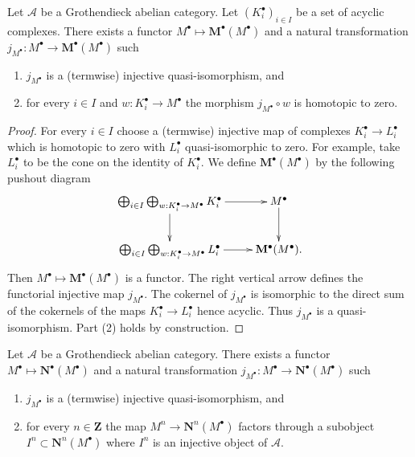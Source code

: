 \begin{lemma}
\label{lemma-functorial-homotopies}
Let $\mathcal{A}$ be a Grothendieck abelian category.
Let $(K_i^\bullet)_{i \in I}$ be a set of acyclic complexes.
There exists a functor $M^\bullet \mapsto \mathbf{M}^\bullet(M^\bullet)$
and a natural transformation
$j_{M^\bullet} : M^\bullet \to \mathbf{M}^\bullet(M^\bullet)$
such
\begin{enumerate}
\item $j_{M^\bullet}$ is a (termwise) injective quasi-isomorphism, and
\item for every $i \in I$ and $w : K_i^\bullet \to M^\bullet$
the morphism $j_{M^\bullet} \circ w$ is homotopic to zero.
\end{enumerate}
\end{lemma}

\begin{proof}
For every $i \in I$ choose a (termwise) injective map of complexes
$K_i^\bullet \to L_i^\bullet$ which is homotopic to zero with
$L_i^\bullet$ quasi-isomorphic to zero. For example, take $L_i^\bullet$
to be the cone on the identity of $K_i^\bullet$.
We define $\mathbf{M}^\bullet(M^\bullet)$ by the following pushout diagram
$$
\xymatrix{
\bigoplus_{i \in I}
\bigoplus_{w : K_i^\bullet \to M^\bullet}
K_i^\bullet \ar[r] \ar[d] & M^\bullet \ar[d] \\
\bigoplus_{i \in I}
\bigoplus_{w : K_i^\bullet \to M^\bullet}
L_i^\bullet \ar[r] &  \mathbf{M}^\bullet(M^\bullet).
}
$$
Then $M^\bullet \mapsto \mathbf{M}^\bullet(M^\bullet)$ is a functor. The right
vertical arrow defines the functorial injective map $j_{M^\bullet}$.
The cokernel of $j_{M^\bullet}$ is isomorphic to the direct sum of
the cokernels of the maps $K_i^\bullet \to L_i^\bullet$ hence acyclic.
Thus $j_{M^\bullet}$ is a quasi-isomorphism. Part (2) holds by construction.
\end{proof}

\begin{lemma}
\label{lemma-functorial-injective}
Let $\mathcal{A}$ be a Grothendieck abelian category.
There exists a functor $M^\bullet \mapsto \mathbf{N}^\bullet(M^\bullet)$
and a natural transformation
$j_{M^\bullet} : M^\bullet \to \mathbf{N}^\bullet(M^\bullet)$
such
\begin{enumerate}
\item $j_{M^\bullet}$ is a (termwise) injective quasi-isomorphism, and
\item for every $n \in \mathbf{Z}$ the map $M^n \to \mathbf{N}^n(M^\bullet)$
factors through a subobject $I^n \subset \mathbf{N}^n(M^\bullet)$ where $I^n$
is an injective object of $\mathcal{A}$.
\end{enumerate}
\end{lemma}

